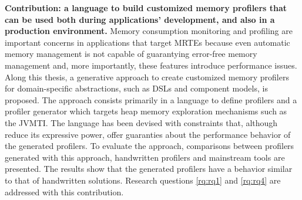 \textbf{Contribution: a language to build customized memory profilers that can be used both during applications' development, and also in a production environment.}
Memory consumption monitoring and profiling are important concerns in applications that target MRTEs because even automatic memory management is not capable of guarantying error-free memory management and, more importantly, these features introduce performance issues.
Along this thesis, a generative approach to create customized memory profilers for domain-specific abstractions, such as DSLs and component models, is proposed.
The approach consists primarily in a language to define profilers and a profiler generator which targets heap memory exploration mechanisms such as the \gls{JVMTI}.
The language has been devised with constraints that, although reduce its expressive power, offer guaranties about the performance behavior of the generated profilers.
To evaluate the approach, comparisons between profilers generated with this approach, handwritten profilers and mainstream tools are presented.
The results show that the generated profilers have a behavior similar to that of handwritten solutions.
Research questions \ref{rq:rq1} and \ref{rq:rq4} are addressed with this contribution.
